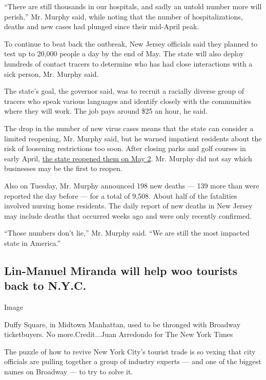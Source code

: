 ``There are still thousands in our hospitals, and sadly an untold number
more will perish,'' Mr. Murphy said, while noting that the number of
hospitalizations, deaths and new cases had plunged since their mid-April
peak.

To continue to beat back the outbreak, New Jersey officials said they
planned to test up to 20,000 people a day by the end of May. The state
will also deploy hundreds of contact tracers to determine who has had
close interactions with a sick person, Mr. Murphy said.

The state's goal, the governor said, was to recruit a racially diverse
group of tracers who speak various languages and identify closely with
the communities where they will work. The job pays around \$25 an hour,
he said.

The drop in the number of new virus cases means that the state can
consider a limited reopening, Mr. Murphy said, but he warned impatient
residents about the risk of loosening restrictions too soon. After
closing parks and golf courses in early April,
\href{https://www.nytimes3xbfgragh.onion/2020/05/02/nyregion/weather-parks-nyc-nj-coronavirus.html}{the
state reopened them on May 2}. Mr. Murphy did not say which businesses
may be the first to reopen.

Also on Tuesday, Mr. Murphy announced 198 new deaths --- 139 more than
were reported the day before --- for a total of 9,508. About half of the
fatalities involved nursing home residents. The daily report of new
deaths in New Jersey may include deaths that occurred weeks ago and were
only recently confirmed.

``Those numbers don't lie,'' Mr. Murphy said. ``We are still the most
impacted state in America.''

\hypertarget{lin-manuel-miranda-will-help-woo-tourists-back-to-nyc}{%
\subsection{Lin-Manuel Miranda will help woo tourists back to
N.Y.C.}\label{lin-manuel-miranda-will-help-woo-tourists-back-to-nyc}}

Image

Duffy Square, in Midtown Manhattan, used to be thronged with Broadway
ticketbuyers. No more.Credit...Juan Arredondo for The New York Times

The puzzle of how to revive New York City's tourist trade is so vexing
that city officials are pulling together a group of industry experts ---
and one of the biggest names on Broadway --- to try to solve it.

